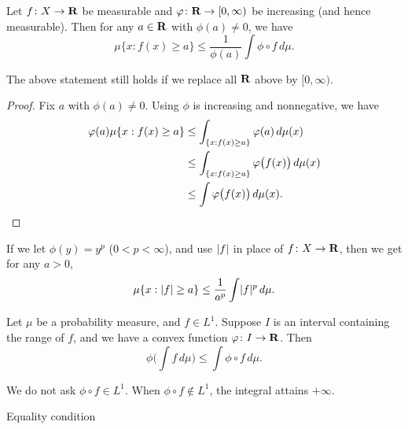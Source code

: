 \begin{namedthm} \label{thm:Markov-ms}
    Let $f\colon X \to \R$ be measurable and $\phi\colon \R \to [0,\infty)$ be increasing (and hence measurable). Then for any $a\in \R$ with $\phi(a)\neq 0$, we have \[
        \mu\{x:f(x) \geq a\} \leq \frac{1}{\phi(a)}\int \phi\circ f\,d\mu.
    \]

    The above statement still holds if we replace all $\R$ above by $[0,\infty)$.
\end{namedthm}
\begin{proof}
    Fix $a$ with $\phi(a)\neq 0$. Using $\phi$ is increasing and nonnegative, we have \begin{align*}
        \phi(a)\mu\{x:f(x) \geq a\} & \leq \int_{\{x:f(x) \geq a\}} \phi(a)\,d\mu(x) \\
        & \leq \int_{\{x:f(x) \geq a\}} \phi\bigl(f(x)\bigr)\,d\mu(x) \\
        & \leq \int \phi\bigl(f(x)\bigr)\,d\mu(x). \qedhere
    \end{align*}
\end{proof}

If we let $\phi(y) = y^p$ ($0<p<\infty$), and use $\abs f$ in place of $f\colon X\to \R$, then we get for any $a > 0$, \begin{equation}
    \mu\{x:\abs{f}\geq a\} \leq \frac{1}{a^p}\int \abs{f}^p\,d\mu. \label{eq:Lp-Markov}
\end{equation}

\begin{namedthm} \label{thm:Jensen-ms}
    Let $\mu$ be a probability measure, and $f\in L^1$. Suppose $I$ is an interval containing the range of $f$, and we have a convex function $\phi\colon I\to \R$. %
    Then \begin{equation}
        \phi\biggl(\int f\,d\mu\biggr) \leq \int \phi\circ f \,d\mu. \label{eq:jensen}
    \end{equation}

    We do not ask $\phi \circ f\in L^1$. When $\phi \circ f \notin L^1$, the integral attains $+\infty$.
\end{namedthm}

Equality condition


